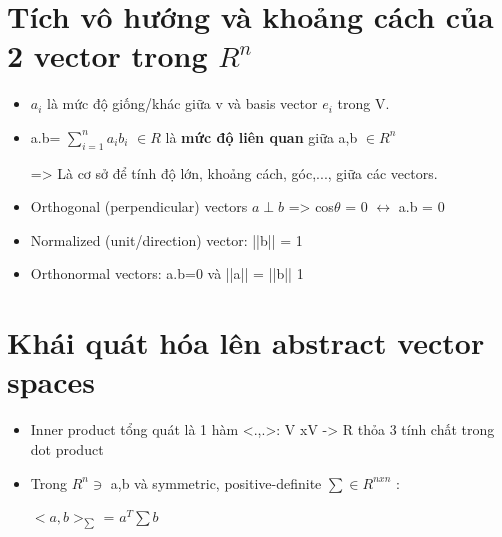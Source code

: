 \documentclass{article}
\begin{document}
\section{Tích vô hướng và khoảng cách của 2 vector trong $R^n$}
\begin{itemize}
    \item $a_i$ là mức độ giống/khác giữa v và basis vector $e_i$ trong V.
    \item a.b= $\sum_{i=1}^n a_i b_i$ $\in R$ là \textbf{mức độ liên quan} giữa a,b $\in R^n$
    
    => Là cơ sở để tính độ lớn, khoảng cách, góc,..., giữa các vectors.
\end{itemize}
\begin{itemize}
    \item Orthogonal (perpendicular) vectors $a \perp b$ => cos$\theta$ = 0 $\leftrightarrow$ a.b = 0
    \item Normalized (unit/direction) vector: ||b|| = 1
    \item Orthonormal vectors: a.b=0 và ||a|| = ||b|| 1
    
\end{itemize}
\section{Khái quát hóa lên abstract vector spaces}
\begin{itemize}
    \item Inner product tổng quát là 1 hàm <.,.>: V xV -> R thỏa 3 tính chất trong dot product
    \item Trong $R^n \ni$ a,b  và symmetric, positive-definite $\sum \in R^{nxn}$ :
    
    $<a,b>_{\sum}$ = $a^T \sum b$
\end{itemize}
\end{document}
